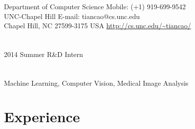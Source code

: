 \documentclass[line,margin]{res}
\begin{document}

\begin{resume}
\section{}
\smallskip
Department of Computer Science  \hfill { Mobile:}  (+1) 919-699-9542 \\
UNC-Chapel Hill \hfill { E-mail:}  tiancao@cs.unc.edu \\
Chapel Hill, NC 27599-3175 USA \hfill  \url{http://cs.unc.edu/~tiancao/} 

\section{}       

2014 Summer R\&D Intern

\vspace{-.05in}
\section{}       

Machine Learning, Computer Vision, Medical Image Analysis
\vspace{-.05in}
\section{\sc Experience} 
\smallskip


\end{resume}
\end{document}
